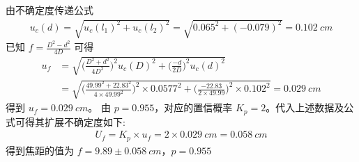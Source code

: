 \documentclass[UTF8]{ctexart}
\begin{document}
由不确定度传递公式
\begin{align*}
    u_c(d) = \sqrt{
    u_c(l_1)^2 + u_c(l_2)^2
    } = \sqrt{0.065^2 + (-0.079)^2} =0.102 \ cm 
\end{align*}
已知 $f = \frac{D^2 - d^2}{4D}$
可得 
\begin{align*}
    u_f &= \sqrt{ \Big( \frac{D^2 + d^2}{4D^2} \Big)^2u_c(D)^2 +
                 \Big( \frac{-d}{2D} \Big)^2u_c(d)^2
    } \\
    &= \sqrt{ \Big( \frac{49.99^2 + 22.83^2}{4 \times 49.99^2} \Big)^2\times 0.0577^2 +
                 \Big( \frac{-22.83}{2 \times 49.99} \Big)^2 \times 0.102^2
    } = 0.029 \ cm 
\end{align*}
得到 $ u_f = 0.029 \ cm$。
由 $p=0.955$，对应的置信概率 $K_p=2$。代入上述数据及公式可得其扩展不确定度如下:
\begin{align*}
    U_f = K_p \times u_f = 2 \times 0.029 \ cm = 0.058 \ cm 
\end{align*}
得到焦距的值为 $f = 9.89 \pm 0.058 \ cm$，$p = 0.955$
\end{document}
